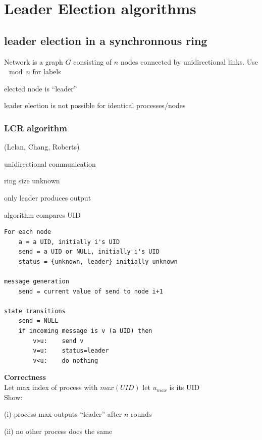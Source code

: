 \chapter{Leader Election algorithms}
\section{leader election in a synchronnous ring}
Network is a graph $G$ consisting of $n$ nodes connected by unidirectional links. Use $\mod n$ for labels\\
\begin{compactitem}
\item elected node is ``leader''
\item leader election is not possible for identical processes/nodes
\end{compactitem}

\subsection{LCR algorithm}
(Lelan, Chang, Roberts)\\

\begin{compactitem}
\item unidirectional communication
\item ring size unknown
\item only leader produces output
\item algorithm compares UID
\end{compactitem}

\begin{lstlisting}
For each node
	a = a UID, initially i's UID
	send = a UID or NULL, initially i's UID
	status = {unknown, leader} initially unknown

message generation
	send = current value of send to node i+1

state transitions
	send = NULL
	if incoming message is v (a UID) then
		v>u: 	send v
		v=u: 	status=leader
		v<u: 	do nothing
\end{lstlisting}

\textbf{Correctness}\\
Let max index of process with $max(UID)$ let $u_{max}$ is its UID\\
Show:\\
\begin{compactitem}
\item[(i)] process max outputs ``leader'' after $n$ rounds
\item[(ii)] no other process does the same
\end{compactitem}


